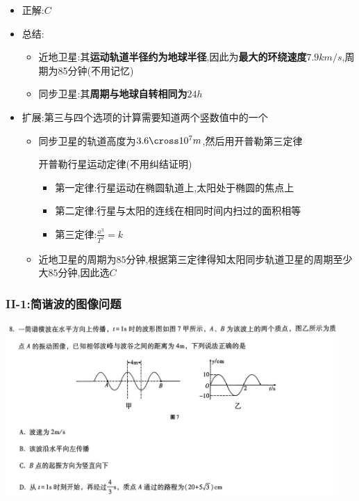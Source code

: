 \documentclass{article}
\begin{document}
\begin{itemize}
    \item 正解:\quad $C$
    \item 总结:\quad
          \begin{itemize}
              \item 近地卫星:其\textbf{运动轨道半径约为地球半径},因此为\textbf{最大的环绕速度$7.9km/s$},周期为85分钟(不用记忆)
              \item 同步卫星:其\textbf{周期与地球自转相同为$24h$}
          \end{itemize}
    \item 扩展:第三与四个选项的计算需要知道两个竖数值中的一个
          \begin{itemize}
              \item 同步卫星的轨道高度为$3.6 \cross 10^{7} m$,然后用开普勒第三定律
                    \begin{thm*}
                        开普勒行星运动定律(不用纠结证明)
                        \begin{itemize}
                            \item 第一定律:行星运动在椭圆轨道上,太阳处于椭圆的焦点上
                            \item 第二定律:行星与太阳的连线在相同时间内扫过的面积相等
                            \item 第三定律:$\frac{a^{3}}{T^{2}} = k$
                        \end{itemize}
                    \end{thm*}
              \item 近地卫星的周期为$85$分钟,根据第三定律得知太阳同步轨道卫星的周期至少大$85$分钟,因此选$C$
          \end{itemize}
\end{itemize}

\vspace{2em}

\subsubsection{II-1:简谐波的图像问题}
\includegraphics[width=0.95\textwidth,keepaspectratio]{./pictures/3.1-2.png}
\end{document}
